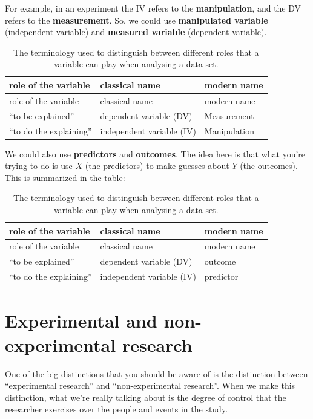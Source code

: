 \documentclass[
]{book}
\begin{document}
For example, in an experiment the IV refers to the \textbf{manipulation}, and the DV refers to the \textbf{measurement}. So, we could use \textbf{manipulated variable} (independent variable) and \textbf{measured variable} (dependent variable).

\begin{longtable}[]{@{}lll@{}}
\caption{The terminology used to distinguish between different roles that a variable can play when analysing a data set.}\tabularnewline
\toprule\noalign{}
role of the variable & classical name & modern name \\
\midrule\noalign{}
\endfirsthead
\toprule\noalign{}
role of the variable & classical name & modern name \\
\midrule\noalign{}
\endhead
\bottomrule\noalign{}
\endlastfoot
``to be explained'' & dependent variable (DV) & Measurement \\
``to do the explaining'' & independent variable (IV) & Manipulation \\
\end{longtable}

We could also use \textbf{predictors} and \textbf{outcomes}. The idea here is that what you're trying to do is use \(X\) (the predictors) to make guesses about \(Y\) (the outcomes). This is summarized in the table:

\begin{longtable}[]{@{}lll@{}}
\caption{The terminology used to distinguish between different roles that a variable can play when analysing a data set.}\tabularnewline
\toprule\noalign{}
role of the variable & classical name & modern name \\
\midrule\noalign{}
\endfirsthead
\toprule\noalign{}
role of the variable & classical name & modern name \\
\midrule\noalign{}
\endhead
\bottomrule\noalign{}
\endlastfoot
``to be explained'' & dependent variable (DV) & outcome \\
``to do the explaining'' & independent variable (IV) & predictor \\
\end{longtable}

\section{Experimental and non-experimental research}\label{experimental-and-non-experimental-research}

One of the big distinctions that you should be aware of is the distinction between ``experimental research'' and ``non-experimental research''. When we make this distinction, what we're really talking about is the degree of control that the researcher exercises over the people and events in the study.
\end{document}
